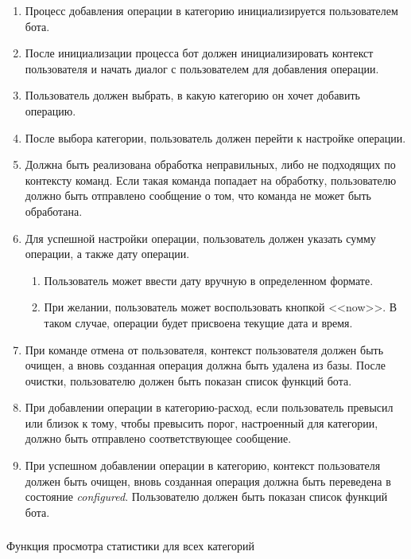 \begin{enumerate}
	\item Процесс добавления операции в категорию инициализируется пользователем бота.
	\item После инициализации процесса бот должен инициализировать контекст пользователя и начать диалог с пользователем для добавления операции.
	\item Пользователь должен выбрать, в какую категорию он хочет добавить операцию.
	\item После выбора категории, пользователь должен перейти к настройке операции.
	\item Должна быть реализована обработка неправильных, либо не подходящих по контексту команд. Если такая команда попадает на обработку, пользователю должно быть отправлено сообщение о том, что команда не может быть обработана.
	\item Для успешной настройки операции, пользователь должен указать сумму операции, а также дату операции.
	\begin{enumerate}
		\item Пользователь может ввести дату вручную в определенном формате.
		\item При желании, пользователь может воспользовать кнопкой <<now>>. В таком случае, операции будет присвоена текущие дата и время.
	\end{enumerate}
	\item При команде отмена от пользователя, контекст пользователя должен быть очищен, а вновь созданная операция должна быть удалена из базы. После очистки, пользователю должен быть показан список функций бота.
	\item При добавлении операции в категорию-расход, если пользователь превысил или близок к тому, чтобы превысить порог, настроенный для категории, должно быть отправлено соответствующее сообщение.
	\item При успешном добавлении операции в категорию, контекст пользователя должен быть очищен, вновь созданная операция должна быть переведена в состояние \emph{configured}. Пользователю должен быть показан список функций бота.
\end{enumerate}

\vskip 0.5in
\subsubsection{} Функция просмотра статистики для всех категорий
\label{sec:domain:specification:showallstats}

